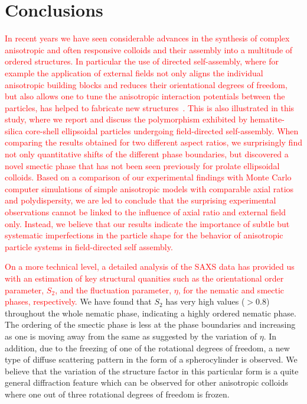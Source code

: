 \documentclass[aps,prl,preprint,superscriptaddress]{revtex4-1} %
\begin{document}
\section*{Conclusions}
\textcolor{red}{In recent years we have seen considerable advances in the synthesis of complex anisotropic and often responsive colloids and their assembly into a multitude of ordered structures. In particular the use of directed self-assembly, where for example the application of external fields not only aligns the individual anisotropic building blocks and reduces their orientational degrees of freedom, but also allows one to tune the anisotropic interaction potentials between the particles, has helped to fabricate new structures~\cite{Schurtenberger2016}. This is also illustrated in this study, where we report and discuss the polymorphism exhibited by hematite-silica core-shell ellipsoidal particles undergoing field-directed self-assembly. When comparing the results obtained for two different aspect ratios, we surprisingly find not only quantitative shifts of the different phase boundaries, but discovered a novel smectic phase that has not been seen previously for prolate ellipsoidal colloids. Based on a comparison of our experimental findings with Monte Carlo computer simulations of simple anisotropic models with comparable axial ratios and polydispersity, we are led to conclude that the surprising experimental observations cannot be linked to the influence of axial ratio and external field only. Instead, we believe that our results indicate the importance of subtle but systematic imperfections in the particle shape for the behavior of anisotropic particle systems in field-directed self assembly.}\par
\textcolor{red}{On a more technical level, a detailed analysis of the SAXS data has provided us with an estimation of key structural quanities such as the orientational order parameter, $S_2$, and the fluctuation parameter, $\eta$, for the nematic and smectic phases, respectively.} We have found that $S_2$ has very high values ($>0.8$) throughout the whole nematic phase, indicating a highly ordered nematic phase. The ordering of the smectic phase is less at the phase boundaries and increasing as one is moving away from the same as suggested by the variation of $\eta$. In addition, due to the freezing of one of the rotational degrees of freedom, a new type of diffuse scattering pattern in the form of a spherocylinder is observed. We believe that the variation of the structure factor in this particular form is a quite general diffraction feature which can be observed for other anisotropic colloids where one out of three rotational degrees of freedom is frozen.\par 
\end{document}
